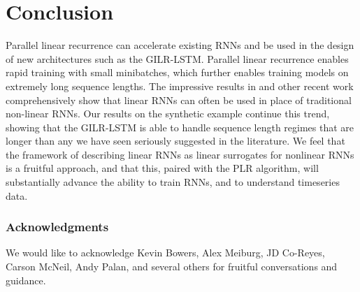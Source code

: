 \documentclass{article}
\begin{document}
\section{Conclusion}
Parallel linear recurrence can accelerate existing RNNs and be used in the design
of new architectures such as the GILR-LSTM. Parallel linear recurrence enables
rapid training with small minibatches, which further enables training models on
extremely long sequence lengths.
The impressive results in
\cite{lei2017} and other recent work comprehensively show that
linear RNNs can often be used in place of traditional non-linear RNNs.
Our results on the synthetic example continue this trend, showing that
the GILR-LSTM is able to handle sequence length regimes that are longer than any
we have seen seriously suggested in the literature. We feel that the framework
of describing linear RNNs as linear surrogates for nonlinear RNNs is a fruitful
approach, and that this, paired with the PLR algorithm, will substantially
advance the ability to train RNNs, and to understand timeseries data.

\subsubsection*{Acknowledgments}
We would like to acknowledge Kevin Bowers, Alex Meiburg, JD Co-Reyes, Carson
McNeil, Andy Palan, and several others for fruitful conversations and guidance.
\end{document}
